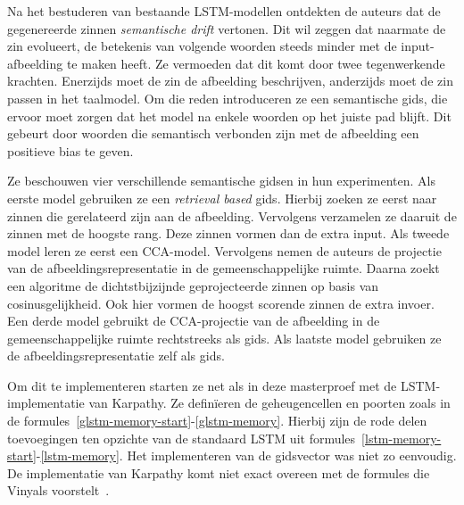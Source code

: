 Na het bestuderen van bestaande LSTM-modellen ontdekten de auteurs dat de gegenereerde zinnen \emph{semantische drift} vertonen. Dit wil zeggen dat naarmate de zin evolueert, de betekenis van volgende woorden steeds minder met de input-afbeelding te maken heeft. Ze vermoeden dat dit komt door twee tegenwerkende krachten. Enerzijds moet de zin de afbeelding beschrijven, anderzijds moet de zin passen in het taalmodel. Om die reden introduceren ze een semantische gids, die ervoor moet zorgen dat het model na enkele woorden op het juiste pad blijft. Dit gebeurt door woorden die semantisch verbonden zijn met de afbeelding een positieve bias te geven.

Ze beschouwen vier verschillende semantische gidsen in hun experimenten. Als eerste model gebruiken ze een \emph{retrieval based} gids. Hierbij zoeken ze eerst naar zinnen die gerelateerd zijn aan de afbeelding. Vervolgens verzamelen ze daaruit de zinnen met de hoogste rang. Deze zinnen vormen dan de extra input.
Als tweede model leren ze eerst een CCA-model. Vervolgens nemen de auteurs de projectie van de afbeeldingsrepresentatie in de gemeenschappelijke ruimte. Daarna zoekt een algoritme de dichtstbijzijnde geprojecteerde zinnen op basis van cosinusgelijkheid. Ook hier vormen de hoogst scorende zinnen de extra invoer.
Een derde model gebruikt de CCA-projectie van de afbeelding in de gemeenschappelijke ruimte rechtstreeks als gids.
Als laatste model gebruiken ze de afbeeldingsrepresentatie zelf als gids.

Om dit te implementeren starten ze net als in deze masterproef met de LSTM-implementatie van Karpathy. Ze defin\"ieren de geheugencellen en poorten zoals in de formules~\eqref{glstm-memory-start}-\eqref{glstm-memory}. Hierbij zijn de rode delen toevoegingen ten opzichte van de standaard LSTM uit formules~\eqref{lstm-memory-start}-\eqref{lstm-memory}. Het implementeren van de gidsvector was niet zo eenvoudig. De implementatie van Karpathy komt niet exact overeen met de formules die Vinyals voorstelt~\cite{Google}. 

